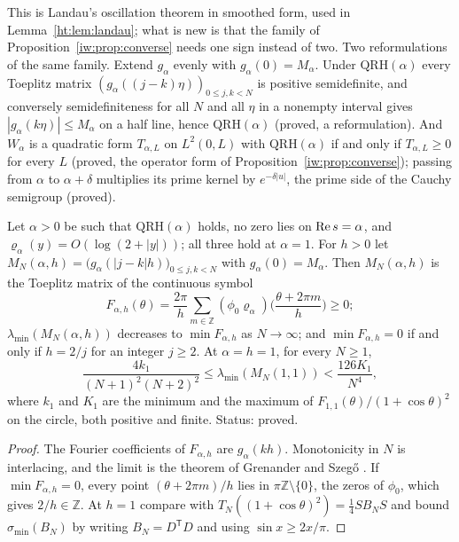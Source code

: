 This is Landau's oscillation theorem in smoothed form, used in Lemma~\ref{ht:lem:landau}; what is new is that the family of Proposition~\ref{iw:prop:converse} needs one sign instead of two. Two reformulations of the same family. Extend $g_\alpha$ evenly with $g_\alpha(0)=M_\alpha$. Under $\mathrm{QRH}(\alpha)$ every Toeplitz matrix $(g_\alpha((j-k)\eta))_{0\le j,k<N}$ is positive semidefinite, and conversely semidefiniteness for all $N$ and all $\eta$ in a nonempty interval gives $|g_\alpha(k\eta)|\le M_\alpha$ on a half line, hence $\mathrm{QRH}(\alpha)$ (proved, a reformulation). And $W_\alpha$ is a quadratic form $T_{\alpha,L}$ on $L^2(0,L)$ with $\mathrm{QRH}(\alpha)$ if and only if $T_{\alpha,L}\ge0$ for every $L$ (proved, the operator form of Proposition~\ref{iw:prop:converse}); passing from $\alpha$ to $\alpha+\delta$ multiplies its prime kernel by $e^{-\delta|u|}$, the prime side of the Cauchy semigroup (proved).

\begin{proposition}\label{rg:prop:toeplitz1}
Let $\alpha>0$ be such that $\mathrm{QRH}(\alpha)$ holds, no zero lies on $\operatorname{Re} s=\alpha$, and $\varrho_\alpha(y)=O(\log(2+|y|))$; all three hold at $\alpha=1$. For $h>0$ let $M_N(\alpha,h)=\big(g_\alpha(|j-k|h)\big)_{0\le j,k<N}$ with $g_\alpha(0)=M_\alpha$. Then $M_N(\alpha,h)$ is the Toeplitz matrix of the continuous symbol
\[
F_{\alpha,h}(\theta)=\frac{2\pi}h\sum_{m\in\mathbb Z}(\phi_0\varrho_\alpha)\Big(\frac{\theta+2\pi m}h\Big)\ge0;
\]
$\lambda_{\min}(M_N(\alpha,h))$ decreases to $\min F_{\alpha,h}$ as $N\to\infty$; and $\min F_{\alpha,h}=0$ if and only if $h=2/j$ for an integer $j\ge2$. At $\alpha=h=1$, for every $N\ge1$,
\[
\frac{4k_1}{(N+1)^2(N+2)^2}\le\lambda_{\min}(M_N(1,1))<\frac{126K_1}{N^4},
\]
where $k_1$ and $K_1$ are the minimum and the maximum of $F_{1,1}(\theta)/(1+\cos\theta)^2$ on the circle, both positive and finite. Status: proved.
\end{proposition}

\begin{proof}
The Fourier coefficients of $F_{\alpha,h}$ are $g_\alpha(kh)$. Monotonicity in $N$ is interlacing, and the limit is the theorem of Grenander and Szeg\H o \cite{NCGrenanderSzego58}. If $\min F_{\alpha,h}=0$, every point $(\theta+2\pi m)/h$ lies in $\pi\mathbb Z\setminus\{0\}$, the zeros of $\phi_0$, which gives $2/h\in\mathbb Z$. At $h=1$ compare with $T_N((1+\cos\theta)^2)=\frac14SB_NS$ and bound $\sigma_{\min}(B_N)$ by writing $B_N=D^{\mathsf T}D$ and using $\sin x\ge2x/\pi$.
\end{proof}

